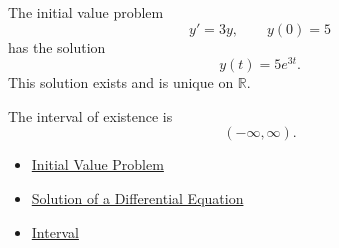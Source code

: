 \begin{remark*}[Examples]
The initial value problem
\[
y'=3y,
\qquad
y(0)=5
\]
has the solution
\[
y(t)=5e^{3t}.
\]
This solution exists and is unique on $\mathbb{R}$.

The interval of existence is
\[
(-\infty,\infty).
\]
\end{remark*}

\begin{dependencies}
\begin{itemize}
  \item \hyperref[def:ordinary-differential-equations-solutions-initial-value-problem]{Initial Value Problem}
  \item \hyperref[def:ordinary-differential-equations-terminology-solution-of-a-differential-equation]{Solution of a Differential Equation}
  \item \hyperref[def:interval]{Interval}
\end{itemize}
\end{dependencies}
